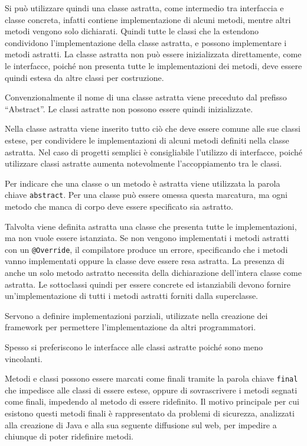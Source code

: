 \documentclass{article}
\numberwithin{equation}{subsection}
\begin{document}
Si può utilizzare quindi una classe astratta, come intermedio tra interfaccia e classe concreta, infatti contiene implementazione di alcuni metodi, mentre altri metodi 
vengono solo dichiarati. Quindi tutte le classi che la estendono condividono l'implementazione della classe astratta, e possono implementare i metodi astratti. 
La classe astratta non può essere inizializzata direttamente, come le interfacce, poiché non presenta tutte le implementazioni dei metodi, deve essere quindi estesa da altre 
classi per costruzione. 



Convenzionalmente il nome di una classe astratta viene preceduto dal prefisso ``Abstract''. Le classi astratte non possono essere quindi inizializzate. 


Nella classe astratta viene inserito tutto ciò che deve essere comune alle sue classi estese, per condividere le implementazioni di alcuni metodi definiti nella classe 
astratta. Nel caso di progetti semplici è consigliabile l'utilizzo di interfacce, poiché utilizzare classi astratte aumenta notevolmente l'accoppiamento tra le classi. 

Per indicare che una classe o un metodo è astratta viene utilizzata la parola chiave \verb|abstract|. 
Per una classe può essere omessa questa marcatura, ma ogni metodo che manca di corpo deve essere specificato sia astratto. 

Talvolta viene definita astratta una classe che presenta tutte le implementazioni, ma non vuole essere istanziata. 
Se non vengono implementati i metodi astratti con un \verb|@Override|, il compilatore produce un errore, specificando che i metodi vanno implementati oppure la classe 
deve essere resa astratta. 
La presenza di anche un solo metodo astratto necessita della dichiarazione dell'intera classe come astratta. 
Le sottoclassi quindi per essere concrete ed istanziabili devono fornire un'implementazione di tutti i metodi astratti forniti dalla superclasse. 


Servono a definire implementazioni parziali, utilizzate nella creazione dei framework per permettere l'implementazione da altri programmatori. 

Spesso si preferiscono le interfacce alle classi astratte poiché sono meno vincolanti. 



Metodi e classi possono essere marcati come finali tramite la parola chiave \verb|final| che impedisce alle classi di essere estese, oppure di sovrascrivere i metodi 
segnati come finali, impedendo al metodo di essere ridefinito. Il motivo principale per cui esistono questi metodi finali è rappresentato da problemi di sicurezza, 
analizzati alla creazione di Java e alla sua seguente diffusione sul web, per impedire a chiunque di poter ridefinire metodi. 
\end{document}
